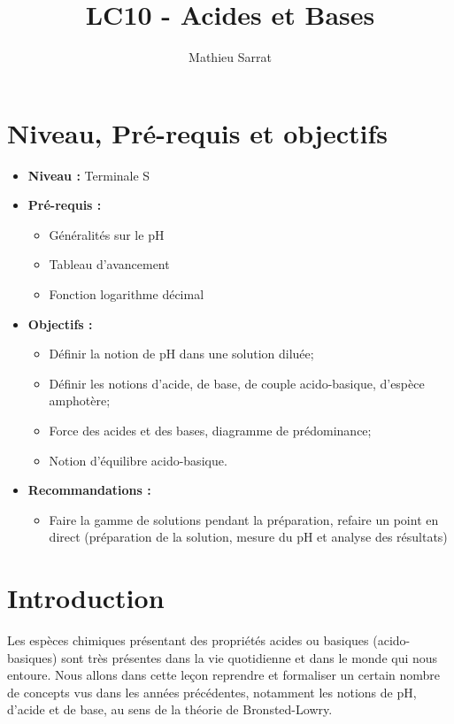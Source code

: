 \documentclass[11pt,a4paper]{report}
\author{Mathieu Sarrat}
\title{LC10 - Acides et Bases}
\begin{document}
\maketitle

\section*{Niveau, Pré-requis et objectifs}
\begin{itemize}
	\item \textbf{Niveau :} Terminale S\\
	
	\item \textbf{Pré-requis :}
		\begin{itemize}
			\item Généralités sur le pH
			\item Tableau d'avancement
			\item Fonction logarithme décimal\\
		\end{itemize}
	
	\item \textbf{Objectifs :}
		\begin{itemize}
			\item Définir la notion de pH dans une solution diluée;
			\item Définir les notions d'acide, de base, de couple acido-basique, d'espèce amphotère;
			\item Force des acides et des bases, diagramme de prédominance;
			\item Notion d'équilibre acido-basique.\\
		\end{itemize}
		
	\item \textbf{Recommandations :}
		\begin{itemize}
			\item Faire la gamme de solutions pendant la préparation, refaire un point en direct 						(préparation de la solution, mesure du pH et analyse des résultats)
		\end{itemize}
\end{itemize}

\newpage
\section*{Introduction}

Les espèces chimiques présentant des propriétés acides ou basiques (acido-basiques) sont très présentes dans la vie quotidienne et dans le monde qui nous entoure. Nous allons dans cette leçon reprendre et formaliser un certain nombre de concepts vus dans les années précédentes, notamment les notions de pH, d'acide et de base, au sens de la théorie de Bronsted-Lowry.\\
\end{document}
